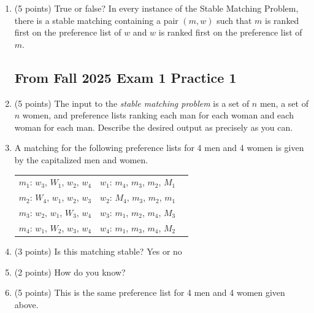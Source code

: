 \documentclass[11pt]{article}
\begin{document}
\begin{enumerate}
 What is the outcome of the Gale-Shapley algorithm on this input? Assume that men propose to women.
\vspace{1in}



\item (5 points) True or false? In every instance of the
 Stable Matching Problem, there is a stable matching containing a pair $(m,w)$
 such that $m$ is ranked first on the preference list of $w$ and $w$ is ranked
 first on the preference list of $m$.


\newpage

\subsection*{From Fall 2025 Exam 1 Practice 1}
\item (5 points) The input to the \emph{stable
matching problem} is a set of $n$ men, a set of $n$ women, and preference lists
ranking each man for each woman and each woman for each man. Describe the
desired output as precisely as you can.

\vspace{1in}

\item A matching for the following preference lists for 4 men and 4 women is given by
the capitalized men and women.

\begin{center}
\begin{tabular}{ c c c }
    $m_1$: $w_3$, $W_1$, $w_2$, $w_4$ &  $w_1$: $m_4$, $m_3$, $m_2$, $M_1$\\
    $m_2$: $W_4$, $w_1$, $w_2$, $w_3$ &  $w_2$: $M_4$, $m_3$, $m_2$, $m_1$\\
    $m_3$: $w_2$, $w_1$, $W_3$, $w_4$ &  $w_3$: $m_1$, $m_2$, $m_4$, $M_3$\\ 
    $m_4$: $w_1$, $W_2$, $w_3$, $w_4$ &  $w_4$: $m_1$, $m_3$, $m_4$, $M_2$
\end{tabular}
\end{center}

    
    \item (3 points) Is this matching stable? Yes or no

    \item (2 points) How do you know?

\vspace{1in}


\item (5 points)
This is the same preference list for 4 men and 4 women given above.


\end{enumerate}
\end{document}
